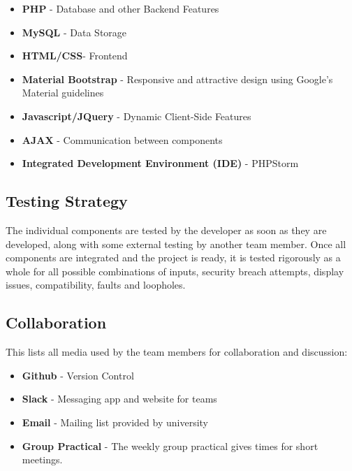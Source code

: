 \documentclass[12pt]{article}
\begin{document}
\begin{itemize}
    
    \item \textbf{PHP} - Database and other Backend Features

    \item \textbf{MySQL} - Data Storage
    
    \item \textbf{HTML/CSS}- Frontend
    
    \item \textbf{Material Bootstrap} - Responsive and attractive design using Google's Material guidelines
    
    \item \textbf{Javascript/JQuery} - Dynamic Client-Side Features
    
    \item \textbf{AJAX} - Communication between components
    
    \item \textbf{Integrated Development Environment (IDE)} - PHPStorm

\end{itemize}

\subsection{Testing Strategy}

The individual components are tested by the developer as soon as they are developed, along with some external testing by another team member. Once all components are integrated and the project is ready, it is tested rigorously as a whole for all possible combinations of inputs, security breach attempts, display issues, compatibility, faults and loopholes.

\subsection{Collaboration}

This lists all media used by the team members for collaboration and discussion:

\begin{itemize}

\item \textbf{Github} - Version Control 


\item \textbf{Slack} - Messaging app and website for teams


\item \textbf{Email} - Mailing list provided by university


\item \textbf{Group Practical} - The weekly group practical gives times for short meetings.

\end{itemize}
\end{document}
